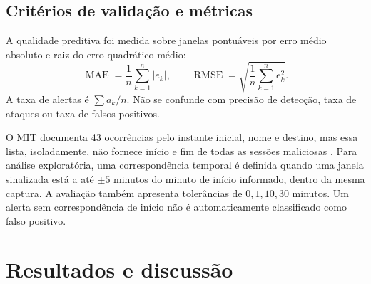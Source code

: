 \documentclass[12pt,oneside,a4paper,brazil]{abntex2}
\begin{document}
\section{Critérios de validação e métricas}
A qualidade preditiva foi medida sobre janelas pontuáveis por erro médio absoluto e raiz do erro quadrático médio:
\begin{equation}
\operatorname{MAE}=\frac1n\sum_{k=1}^{n}|e_k|,\qquad
\operatorname{RMSE}=\sqrt{\frac1n\sum_{k=1}^{n}e_k^2}.
\end{equation}
A taxa de alertas é $\sum a_k/n$. Não se confunde com precisão de detecção, taxa de ataques ou taxa de falsos positivos.

O MIT documenta 43 ocorrências pelo instante inicial, nome e destino, mas essa lista, isoladamente, não fornece início e fim de todas as sessões maliciosas \cite{mitataques}. Para análise exploratória, uma correspondência temporal é definida quando uma janela sinalizada está a até $\pm5$ minutos do minuto de início informado, dentro da mesma captura. A avaliação também apresenta tolerâncias de $0,1,10,30$ minutos. Um alerta sem correspondência de início não é automaticamente classificado como falso positivo.

\chapter{Resultados e discussão}
\end{document}
